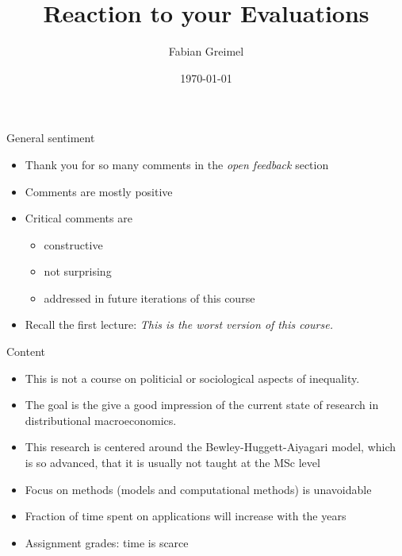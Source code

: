 \documentclass{beamer}
\begin{document}
\begin{frame}
    \title{Reaction to your Evaluations}
    \author{Fabian Greimel}
    \date{\today}
    \maketitle
\end{frame}

\begin{frame}{General sentiment}

\begin{itemize}
  \item Thank you for so many comments in the \emph{open feedback} section
  \item Comments are mostly positive
  \item Critical comments are 
  \begin{itemize}
    \item constructive
    \item not surprising
    \item addressed in future iterations of this course
  \end{itemize}
  \item Recall the first lecture: \emph{This is the worst version of this course.} 
\end{itemize}

\end{frame}
\begin{frame}{Content}

\begin{itemize}
  \item This is not a course on politicial or sociological aspects of inequality.
  \item The goal is the give a good impression of the current state of research in distributional macroeconomics.
  \item This research is centered around the Bewley-Huggett-Aiyagari model, which is so advanced, that it is usually not taught at the MSc level
  \item Focus on methods (models and computational methods) is unavoidable
  \item Fraction of time spent on applications will increase with the years
  \item Assignment grades: time is scarce
\end{itemize}
\end{frame}
\end{document}
